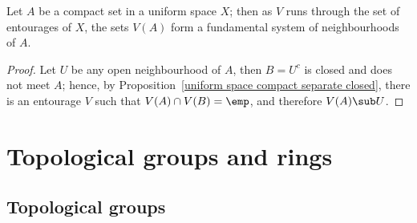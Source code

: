 \begin{corollary}\label{uniform space compact subset nbhd by entourage}
Let $A$ be a compact set in a uniform space $X$; then as $V$ runs through the set of entourages of $X$, the sets $V(A)$ form a fundamental system of neighbourhoods of $A$.
\end{corollary}
\begin{proof}
Let $U$ be any open neighbourhood of $A$, then $B=U^c$ is closed and does not meet $A$; hence, by Proposition~\ref{uniform space compact separate closed}, there is an entourage $V$ such that $V(A)\cap V(B)=\emp$, and therefore $V(A)\sub U$.
\end{proof}
\chapter{Topological groups and rings}
\section{Topological groups}
